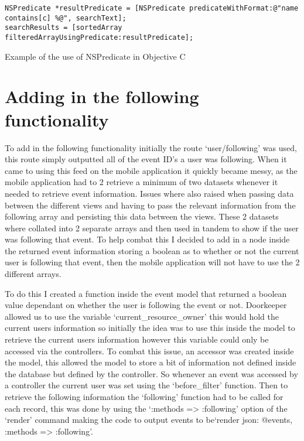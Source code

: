 		\begin{program}
			\begin{lstlisting}
NSPredicate *resultPredicate = [NSPredicate predicateWithFormat:@"name contains[c] %@", searchText];
searchResults = [sortedArray filteredArrayUsingPredicate:resultPredicate];
			\end{lstlisting}
			\caption{Example of the use of NSPredicate in Objective C}
			\label{fig:NSPredicate}
		\end{program}

	\section{Adding in the following functionality}
		To add in the following functionality initially the route `user/following' was used, this route simply outputted all of the event ID's a user was following. When it came to using this feed on the mobile application it quickly became messy, as the mobile application had to 2 retrieve a minimum of two datasets whenever it needed to retrieve event information. Issues where also raised when passing  data between the different views  and having to pass the relevant information from the following array and persisting this data between the views. These 2 datasets where collated into 2 separate arrays and then used in tandem to show if the user was following that event. To help combat this I decided to add in a node inside the returned event information storing a boolean as to whether or not the current user is following that event, then the mobile application will not have to use the 2 different arrays. 

		To do this I created a function inside the event model that returned a boolean value dependant on whether the user is following the event or not. Doorkeeper allowed us to use the variable `current\_resource\_owner' this would hold the current users information so initially the idea was to use this inside the model to retrieve the current users information however this variable could only be accessed via the controllers. To combat this issue,  an accessor was created inside the model, this allowed the model to store a bit of information not defined inside the database but defined by the controller. So whenever an event was accessed by a controller the current user was set using the `before\_filter' function. Then to retrieve the following information the `following' function had to be called for each record, this was done by using the `:methods => :following' option of the `render' command making the code to output events to be`render json: @events, :methods => :following'. 

